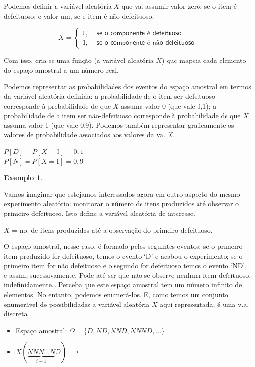 \documentclass[
]{book}
\providecommand{\tightlist}{%
  \setlength{\itemsep}{0pt}\setlength{\parskip}{0pt}}
\theoremstyle{definition}
\theoremstyle{definition}
\newtheorem{example}{Exemplo}[chapter]
\theoremstyle{definition}
\theoremstyle{remark}
\begin{document}
Podemos definir a variável aleatória \(X\) que vai assumir valor zero, se o item é defeituoso; e valor um, se o item é não defeituoso.

\[{X = \left\{
      \begin{array}{ll}
      0, & \textsf{ se o componente é defeituoso}\\
      1, & \textsf{ se o componente é não-defeituoso}
      \end{array} \right.}\]

Com isso, cria-se uma função (a variável aleatória \(X\)) que mapeia cada elemento do espaço amostral a um número real.

Podemos representar as probabilidades dos eventos do espaço amostral em termos da variável aleatória definida: a probabilidade de o item ser defeituoso corresponde à probabilidade de que \(X\) assuma valor 0 (que vale 0,1); a probabilidade de o item ser não-defeituoso corresponde à probabilidade de que \(X\) assuma valor 1 (que vale 0,9). Podemos também representar graficamente os valores de probabilidade associados aos valores da va. \(X\).

\(P[D] = P[X = 0] = 0,1\)\\
\(P[N] = P[X = 1] = 0,9\)

\begin{example}
\protect\hypertarget{exm:unnamed-chunk-2}{}{\label{exm:unnamed-chunk-2} }
\end{example}

Vamos imaginar que estejamos interessados agora em outro aspecto do mesmo experimento aleatório: monitorar o número de itens produzidos até observar o primeiro defeituoso. Isto define a variável aleatória de interesse.

\(X\) = no. de itens produzidos até a observação do primeiro defeituoso.

O espaço amostral, nesse caso, é formado pelos seguintes eventos: se o primeiro item produzido for defeituoso, temos o evento `D' e acabou o experimento; se o primeiro item for não defeituoso e o segundo for defeituoso temos o evento `ND', e assim, sucessivamente. Pode até ser que não se observe nenhum item defeituoso, indefinidamente\ldots{} Perceba que este espaço amostral tem um número infinito de elementos. No entanto, podemos enumerá-los. E, como temos um conjunto enumerável de possibilidades a variável aleatória \(X\) aqui representada, é uma v.a. discreta.

\begin{itemize}
\tightlist
\item
  Espaço amostral: \({\Omega = \{D, ND, NND, NNND, \ldots\}}\)\\
\item
  \({X(\underbrace{NNN \ldots N}_{i-1}D) = i}\)
\end{itemize}
\end{document}
